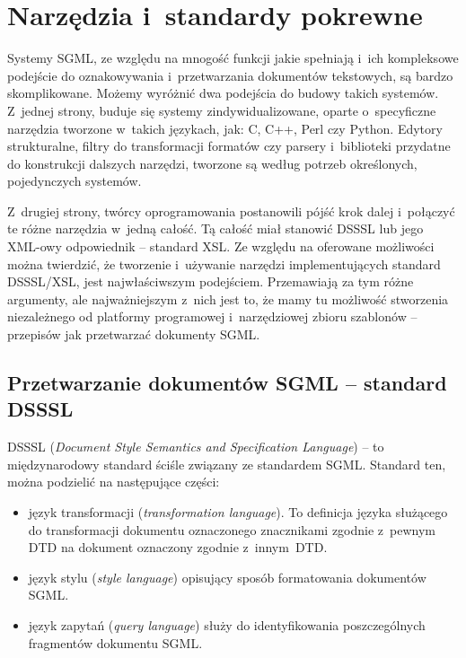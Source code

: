 \documentclass[brudnopis]{xmgr}
\begin{document}
\chapter{Narzędzia i~standardy pokrewne}

Systemy SGML, ze względu na mnogość funkcji jakie spełniają i~ich
kompleksowe podejście do oznakowywania i~przetwarzania dokumentów
tekstowych, są bardzo skomplikowane. Możemy wyróżnić dwa podejścia do
budowy takich systemów.  Z~jednej strony, buduje się systemy
zindywidualizowane, oparte o~specyficzne narzędzia tworzone w~takich
językach, jak: C, C++, Perl czy Python. Edytory strukturalne, filtry
do transformacji formatów czy parsery i~biblioteki
przydatne do konstrukcji dalszych narzędzi, tworzone są według potrzeb
określonych, pojedynczych systemów.

Z~drugiej strony, twórcy oprogramowania postanowili pójść krok dalej
i~połączyć te różne narzędzia w~jedną całość. Tą całość miał stanowić
DSSSL lub jego XML-owy odpowiednik -- standard XSL. Ze względu na
oferowane możliwości można twierdzić, że tworzenie i~używanie narzędzi
implementujących standard DSSSL/XSL, jest najwłaściwszym
podejściem. Przemawiają za tym różne argumenty, ale najważniejszym
z~nich jest to, że mamy tu możliwość stworzenia niezależnego od
platformy programowej i~narzędziowej zbioru szablonów -- przepisów jak
przetwarzać dokumenty SGML.

\section{Przetwarzanie dokumentów SGML -- standard DSSSL\label{s:dsssl}}

DSSSL (\textit{Document Style Semantics and Specification Language\/})
-- to międzynarodowy standard ściśle związany ze standardem SGML.
Standard ten, można podzielić na następujące części:

\begin{itemize}
\item język transformacji (\textit{transformation language\/}).  To
  definicja języka służącego do transformacji dokumentu oznaczonego
  znacznikami zgodnie z~pewnym DTD na dokument oznaczony zgodnie
  z~innym~DTD.
\item język stylu (\textit{style language\/}) opisujący sposób
  formatowania dokumentów SGML.
\item język zapytań (\textit{query language\/}) służy do
  identyfikowania poszczególnych fragmentów dokumentu SGML.
\end{itemize}
\end{document}
